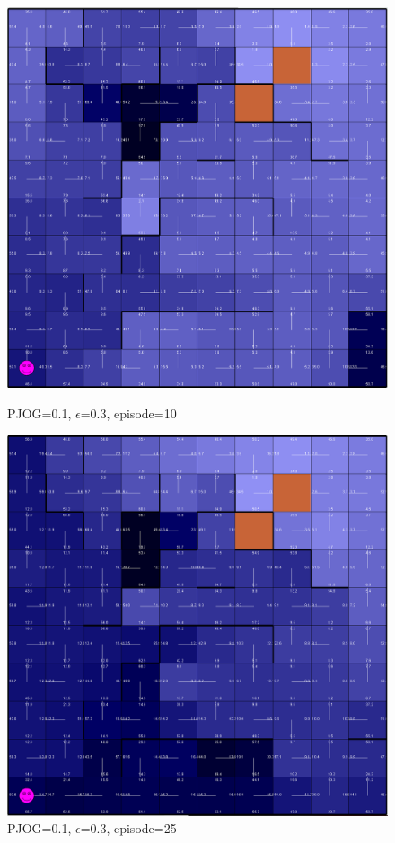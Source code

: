 \documentclass[11pt]{article}
\begin{document}
\begin{figure}[!htb]
   \begin{minipage}{0.34\textwidth}
     \centering
     \includegraphics[width=1.2\linewidth]{../figures/q2_3_10.png}
     \caption{PJOG=0.1, $\epsilon$=0.3, episode=10}\label{Fig:q2_3_10}
   \end{minipage}\hfill
   \begin{minipage}{0.34\textwidth}
     \centering
     \includegraphics[width=1.2\linewidth]{../figures/q2_3_25.png}
     \caption{PJOG=0.1, $\epsilon$=0.3, episode=25}\label{Fig:q2_3_25}
   \end{minipage}
\end{figure}
\end{document}
